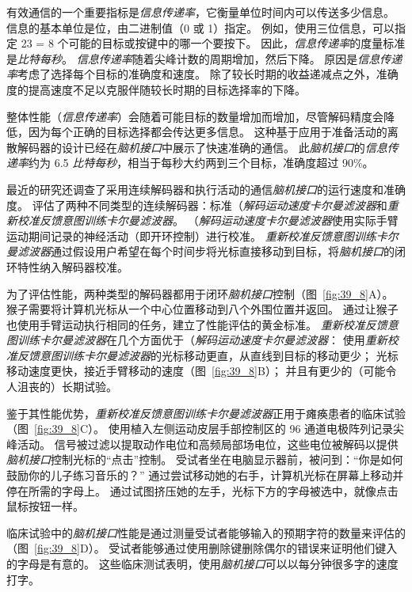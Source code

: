 有效通信的一个重要指标是\textit{信息传递率}，它衡量单位时间内可以传送多少信息。
信息的基本单位是位，由二进制值（0 或 1）指定。
例如，使用三位信息，可以指定 23 = 8 个可能的目标或按键中的哪一个要按下。 
因此，\textit{信息传递率}的度量标准是\textit{比特每秒}。
\textit{信息传递率}随着尖峰计数的周期增加，然后下降。
原因是\textit{信息传递率}考虑了选择每个目标的准确度和速度。
除了较长时期的收益递减点之外，准确度的提高速度不足以克服伴随较长时期的目标选择率的下降。


整体性能（\textit{信息传递率}）会随着可能目标的数量增加而增加，尽管解码精度会降低，因为每个正确的目标选择都会传达更多信息。
这种基于应用于准备活动的离散解码器的设计已经在\textit{脑机接口}中展示了快速准确的通信。
此\textit{脑机接口}的\textit{信息传递率}约为 6.5 \textit{比特每秒}，相当于每秒大约两到三个目标，准确度超过 90\%。


最近的研究还调查了采用连续解码器和执行活动的通信\textit{脑机接口}的运行速度和准确度。
评估了两种不同类型的连续解码器：标准（\textit{解码运动速度卡尔曼滤波器}和\textit{重新校准反馈意图训练卡尔曼滤波器}。
（\textit{解码运动速度卡尔曼滤波器}使用实际手臂运动期间记录的神经活动（即开环控制）进行校准。
\textit{重新校准反馈意图训练卡尔曼滤波器}通过假设用户希望在每个时间步将光标直接移动到目标，将\textit{脑机接口}的闭环特性纳入解码器校准。


为了评估性能，两种类型的解码器都用于闭环\textit{脑机接口}控制（图~\ref{fig:39_8}A）。
猴子需要将计算机光标从一个中心位置移动到八个外围位置并返回。
通过让猴子也使用手臂运动执行相同的任务，建立了性能评估的黄金标准。
\textit{重新校准反馈意图训练卡尔曼滤波器}在几个方面优于（\textit{解码运动速度卡尔曼滤波器}：
使用\textit{重新校准反馈意图训练卡尔曼滤波器}的光标移动更直，从直线到目标的移动更少； 光标移动速度更快，接近手臂移动的速度（图~\ref{fig:39_8}B）； 并且有更少的（可能令人沮丧的）长期试验。


鉴于其性能优势，\textit{重新校准反馈意图训练卡尔曼滤波器}正用于瘫痪患者的临床试验（图~\ref{fig:39_8}C）。
使用植入左侧运动皮层手部控制区的 96 通道电极阵列记录尖峰活动。
信号被过滤以提取动作电位和高频局部场电位，这些电位被解码以提供\textit{脑机接口}控制光标的“点击”控制。
受试者坐在电脑显示器前，被问到：“你是如何鼓励你的儿子练习音乐的？” 通过尝试移动她的右手，计算机光标在屏幕上移动并停在所需的字母上。
通过试图挤压她的左手，光标下方的字母被选中，就像点击鼠标按钮一样。


临床试验中的\textit{脑机接口}性能是通过测量受试者能够输入的预期字符的数量来评估的（图~\ref{fig:39_8}D）。
受试者能够通过使用删除键删除偶尔的错误来证明他们键入的字母是有意的。
这些临床测试表明，使用\textit{脑机接口}可以以每分钟很多字的速度打字。


